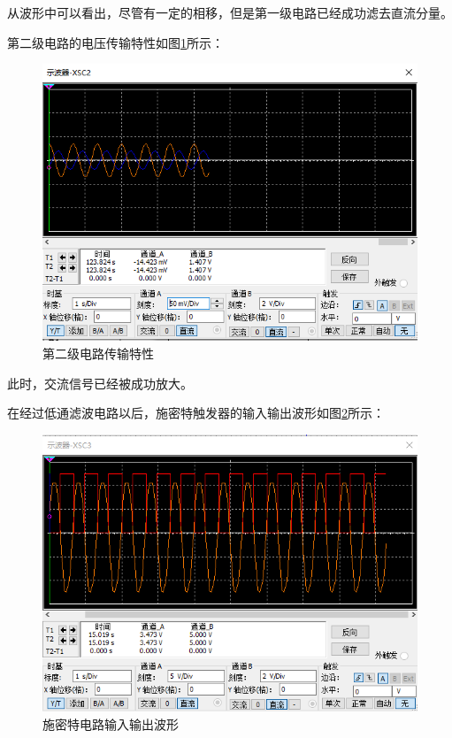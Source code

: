\documentclass{article}
\begin{document}
\begin{spacing}{1.5}
    从波形中可以看出，尽管有一定的相移，但是第一级电路已经成功滤去直流分量。

    第二级电路的电压传输特性如图\ref{fig:sim1_result2}所示：
    \begin{figure}[H]
        \centering
        \includegraphics[scale=0.3]{fig/sim/sim1_result2.png}
        \caption{第二级电路传输特性}
        \label{fig:sim1_result2}
    \end{figure}
    
    此时，交流信号已经被成功放大。

    在经过低通滤波电路以后，施密特触发器的输入输出波形如图\ref{fig:sim1_result3}所示：
    \begin{figure}[H]
        \centering
        \includegraphics[scale=0.3]{fig/sim/sim1_result3.png}
        \caption{施密特电路输入输出波形}
        \label{fig:sim1_result3}
    \end{figure}
    

\end{spacing}
\end{document}
